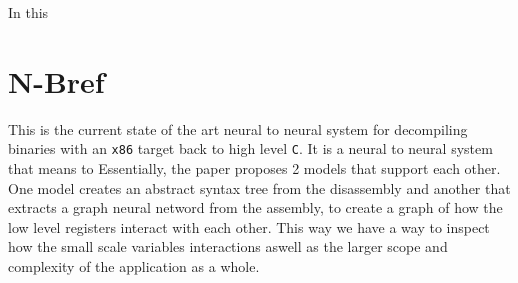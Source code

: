 \documentclass{article}
\begin{document}
In this 

\section{N-Bref}

This is the current state of the art neural to neural system for decompiling binaries with an \verb|x86| target back to high level \verb|C|.
It is a neural to neural system that means to 
Essentially, the paper proposes 2 models that support each other.
One model creates an abstract syntax tree from the disassembly and another that extracts a graph neural netword from the assembly, to create a graph of how the low level registers interact with each other.
This way we have a way to inspect how the small scale variables interactions aswell as the larger scope and complexity of the application as a whole.
\end{document}
